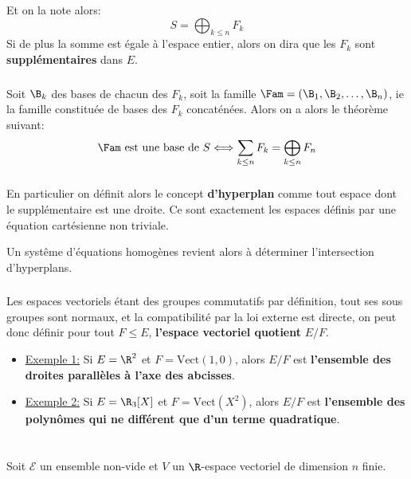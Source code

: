 Et on la note alors:
\[
   S = \bigoplus_{k \leq n} F_k
\]
Si de plus la somme est égale à l'espace entier, alors on dira que les \(F_k\) sont \textbf{supplémentaires} dans \(E\). 
\subsection*{}
Soit \(\B_k\) des bases de chacun des \(F_k\), soit la famille \(\Fam = (\B_1, \B_2, \ldots, \B_n)\), ie la famille constituée de bases des \(F_k\) concaténées. Alors on a alors le théorème suivant:
\[
   \Fam \text{ est une base de } S \Longleftrightarrow \sum_{k \leq n} F_k = \bigoplus_{k \leq n} F_n
\]
\subsection*{}
En particulier on définit alors le concept \textbf{d'hyperplan} comme tout espace dont le supplémentaire est une droite. Ce sont exactement les espaces définis par une équation cartésienne non triviale.\<

Un systême d'équations homogènes revient alors à déterminer l'intersection d'hyperplans.
\subsection*{}
Les espaces vectoriels étant des groupes commutatifs par définition, tout ses sous groupes sont normaux, et la compatibilité par la loi externe est directe, on peut donc définir pour tout \( F \leq E \), \textbf{l'espace vectoriel quotient} \( E/F \).
\begin{itemize}
   \item \uline{Exemple 1:} Si \( E = \R^2 \) et \( F = \text{Vect}(1, 0) \), alors \( E/F \) est \textbf{l'ensemble des droites parallèles à l'axe des abcisses}.
   \item \uline{Exemple 2:} Si \( E = \R_3[X] \) et \( F = \text{Vect}(X^2) \), alors \( E/F \) est \textbf{l'ensemble des polynômes qui ne différent que d'un terme quadratique}.
\end{itemize}
\chapter*{} %
Soit \(\mathscr{E}\) un ensemble non-vide et \(V\) un \(\R\)-espace vectoriel de dimension \(n\) finie.
